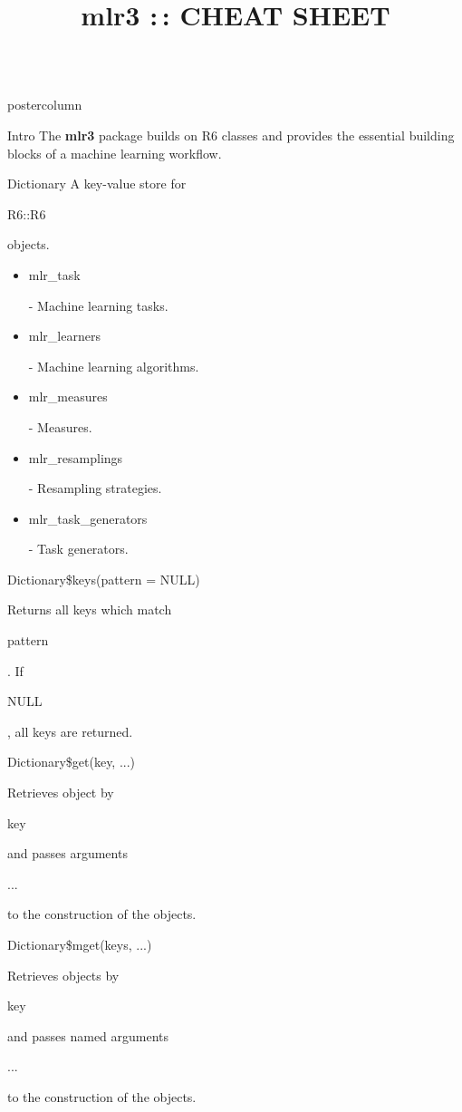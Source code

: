 \documentclass{beamer}
\title{mlr3 :\,: CHEAT SHEET} %
\newlength{\columnheight} %
\newcommand{\codeinline}[1]{\begin{codeboxinline}#1\end{codeboxinline}}
\begin{document}
\begin{frame}[fragile]{}
	\begin{columns}
		\begin{column}{.245\textwidth}
			\begin{beamercolorbox}[center]{postercolumn}
				\begin{minipage}{.98\textwidth}
					\parbox[t][\columnheight]{\textwidth}{
						\begin{myblock}{Intro}
							The \textbf{mlr3} package builds on R6 classes and provides the essential building
							blocks of a machine learning workflow.
						\end{myblock}
						\begin{myblock}{Dictionary}
							A key-value store for \codeinline{R6::R6} objects.\\
							\begin{itemize}
								\item \codeinline{mlr\_task} - Machine learning tasks.
								\item \codeinline{mlr\_learners} - Machine learning algorithms.
								\item \codeinline{mlr\_measures} - Measures.
								\item \codeinline{mlr\_resamplings} - Resampling strategies.
								\item \codeinline{mlr\_task\_generators} - Task generators.
							\end{itemize}
							\vspace{1em}
							\begin{codebox}
								Dictionary\$keys(pattern = NULL)
							\end{codebox}
							Returns all keys which match \codeinline{pattern}. 
							If \codeinline{NULL}, all keys are returned. 
							\\
							\begin{codebox}
								Dictionary\$get(key, ...)
							\end{codebox}
							Retrieves object by \codeinline{key} and 
							passes arguments \codeinline{...} to the construction of the objects.\\
							\begin{codebox}
								Dictionary\$mget(keys, ...)
							\end{codebox}
							Retrieves objects by \codeinline{key} and 
							passes named arguments \codeinline{...} to the construction of the objects. 
						\end{myblock}
					}
				\end{minipage}

\end{beamercolorbox}
\end{column}
\end{columns}
\end{frame}
\end{document}
